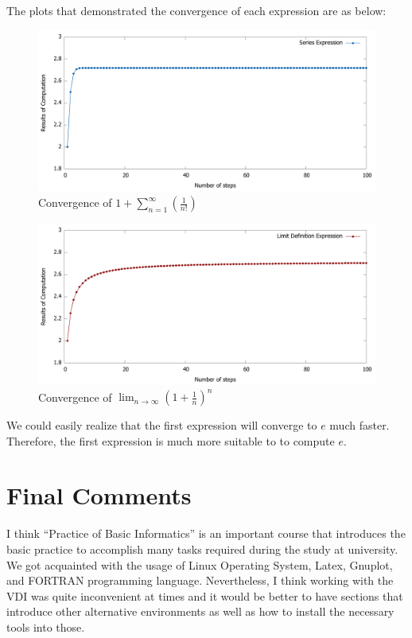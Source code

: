 \documentclass[11pt]{article}
\begin{document}
The plots that demonstrated the convergence of each expression are as below:
\begin{figure}[h]
   \centering
   \includegraphics[scale=0.2]{data1}
   \caption{Convergence of $1+\sum_{n=1}^{\infty}\left(\frac{1}{n !}\right)$}
\end{figure} 
\begin{figure}[h]
   \centering
   \includegraphics[scale=0.2]{data2}
   \caption{Convergence of $\lim _{n \rightarrow \infty}\left(1+\frac{1}{n}\right)^{n}$}
\end{figure} 

We could easily realize that the first expression will converge to $e$ much faster. Therefore, the first expression is much more suitable to to compute $e$.
\newpage
\section{Final Comments}
I think “Practice of Basic Informatics” is an important course that introduces the basic practice to accomplish many tasks required during the study at university. We got acquainted with the usage of Linux Operating System, Latex, Gnuplot, and FORTRAN programming language. Nevertheless, I think working with the VDI was quite inconvenient at times and it would be better to have sections that introduce other alternative environments as well as how to install the necessary tools into those.  
\end{document}
